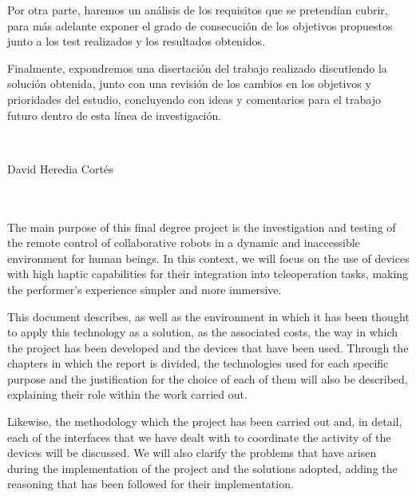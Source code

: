 Por otra parte, haremos un análisis de los requisitos que se pretendían cubrir, para más adelante exponer el grado de consecución de los objetivos propuestos junto a los test realizados y los resultados obtenidos.

Finalmente, expondremos una disertación del trabajo realizado discutiendo la solución obtenida, junto con una revisión de los cambios en los objetivos y prioridades del estudio, concluyendo con ideas y comentarios para el trabajo futuro dentro de esta línea de investigación.


\cleardoublepage


\thispagestyle{empty}


\begin{center}
{\large\bfseries \myTitleEnglish}\\
\end{center}
\begin{center}
David Heredia Cortés
\end{center}

\\

\vspace{0.7cm}
\\

The main purpose of this final degree project is the investigation and testing of the remote control of collaborative robots in a dynamic and inaccessible environment for human beings. In this context, we will focus on the use of devices with high haptic capabilities for their integration into teleoperation tasks, making the performer's experience simpler and more immersive.

This document describes, as well as the environment in which it has been thought to apply this technology as a solution, as the associated costs, the way in which the project has been developed and the devices that have been used. Through the chapters in which the report is divided, the technologies used for each specific purpose and the justification for the choice of each of them will also be described, explaining their role within the work carried out.

Likewise, the methodology which the project has been carried out and, in detail, each of the interfaces that we have dealt with to coordinate the activity of the devices will be discussed. We will also clarify the problems that have arisen during the implementation of the project and the solutions adopted, adding the reasoning that has been followed for their implementation.

